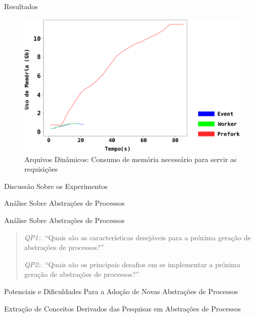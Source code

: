 \documentclass[xcolor={usenames,svgnames,dvipsnames},brazil,english,12pt,aspectratio=149]{beamer}
\begin{document}
\begin{frame}{Resultados}
	\begin{figure}[!h]
		\centering
		\includegraphics[width=.60\textwidth]{dynamic_file_memory_usage}

		\caption{Arquivos Dinâmicos: Consumo de memória necessário para servir as requisições}
		\label{fig:dynamic_file_memory}
	\end{figure}
\end{frame}

\begin{frame}{Discussão Sobre os Experimentos}
\end{frame}

\begin{frame}{Análise Sobre Abstrações de Processos}
\end{frame}

\begin{frame}{Análise Sobre Abstrações de Processos}
	\begin{quote}
	 \item \textit{QP1:.} ``Quais são as características desejáveis para a próxima geração de abstrações de processos?''
	 \item \textit{QP2:.} ``Quais são os principais desafios em se implementar a próxima geração de abstrações de processos?''
	\end{quote}
\end{frame}

\begin{frame}{Potenciais e Dificuldades Para a Adoção de Novas Abstrações de Processos}
	
\end{frame}

\begin{frame}{Extração de Conceitos Derivados das Pesquisas em Abstrações de Processos}
\end{frame}
\end{document}
